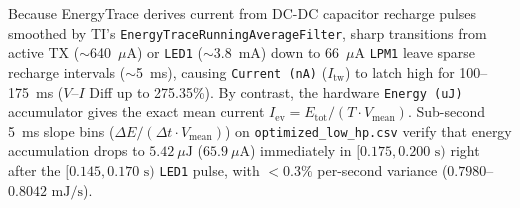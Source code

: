 \documentclass[conference]{IEEEtran}
\begin{document}
Because EnergyTrace derives current from DC-DC capacitor recharge pulses smoothed by TI's \texttt{EnergyTraceRunningAverageFilter}, sharp transitions from active TX ($\sim$640~$\mu\text{A}$) or \texttt{LED1} ($\sim$3.8~mA) down to 66~$\mu\text{A}$ \texttt{LPM1} leave sparse recharge intervals ($\sim$5~ms), causing \texttt{Current (nA)} ($I_{\text{tw}}$) to latch high for 100--175~ms ($V$--$I$ Diff up to 275.35\%). By contrast, the hardware \texttt{Energy (uJ)} accumulator gives the exact mean current $I_{\text{ev}} = E_{\text{tot}} / (T \cdot V_{\text{mean}})$. Sub-second 5~ms slope bins ($\Delta E / (\Delta t \cdot V_{\text{mean}})$) on \texttt{optimized\_low\_hp.csv} verify that energy accumulation drops to $5.42~\mu\text{J}$ ($65.9~\mu\text{A}$) immediately in $[0.175, 0.200\text{~s})$ right after the $[0.145, 0.170\text{~s})$ \texttt{LED1} pulse, with $<0.3\%$ per-second variance ($0.7980$--$0.8042\text{~mJ/s}$).
\end{document}
